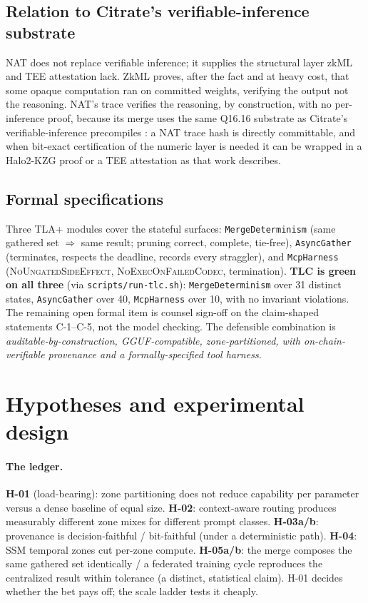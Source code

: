 \documentclass[11pt]{article}
\newcommand{\Qff}{Q16.16}
\begin{document}
\subsection{Relation to Citrate's verifiable-inference substrate}
NAT does not replace verifiable inference; it supplies the structural layer zkML and TEE attestation
lack. ZkML proves, after the fact and at heavy cost, that some opaque computation ran on committed
weights, verifying the output not the reasoning. NAT's trace verifies the reasoning, by construction,
with no per-inference proof, because its merge uses the same \Qff{} substrate as Citrate's
verifiable-inference precompiles \citep{citrate10}: a NAT trace hash is directly committable, and when
bit-exact certification of the numeric layer is needed it can be wrapped in a Halo2-KZG proof or a
TEE attestation as that work describes.

\subsection{Formal specifications}
Three TLA+ modules \citep{lamport2002specifying} cover the stateful surfaces: \texttt{MergeDeterminism} (same gathered set
$\Rightarrow$ same result; pruning correct, complete, tie-free), \texttt{AsyncGather} (terminates,
respects the deadline, records every straggler), and \texttt{McpHarness}
(\textsc{NoUngatedSideEffect}, \textsc{NoExecOnFailedCodec}, termination). \textbf{TLC is green on all
three} (via \texttt{scripts/run-tlc.sh}): \texttt{MergeDeterminism} over 31 distinct states,
\texttt{AsyncGather} over 40, \texttt{McpHarness} over 10, with no invariant violations. The remaining
open formal item is counsel sign-off on the claim-shaped statements C-1--C-5, not the model checking.
The defensible combination is \emph{auditable-by-construction, GGUF-compatible, zone-partitioned, with
on-chain-verifiable provenance and a formally-specified tool harness.}

\section{Hypotheses and experimental design}\label{sec:hyp}

\paragraph{The ledger.}
\textbf{H-01} (load-bearing): zone partitioning does not reduce capability per parameter versus a
dense baseline of equal size. \textbf{H-02}: context-aware routing produces measurably different zone
mixes for different prompt classes. \textbf{H-03a/b}: provenance is decision-faithful / bit-faithful
(under a deterministic path). \textbf{H-04}: SSM temporal zones cut per-zone compute. \textbf{H-05a/b}:
the merge composes the same gathered set identically / a federated training cycle reproduces the
centralized result within tolerance (a distinct, statistical claim). H-01 decides whether the bet
pays off; the scale ladder tests it cheaply.
\end{document}
